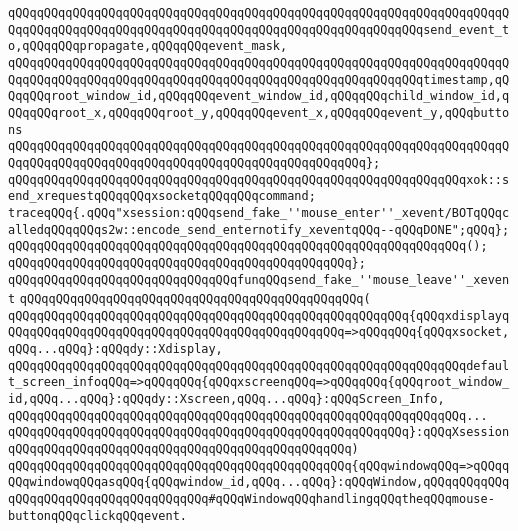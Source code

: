 \verb|qQQqqQQqqQQqqQQqqQQqqQQqqQQqqQQqqQQqqQQqqQQqqQQqqQQqqQQqqQQqqQQqqQQqqQQqqQQqqQQqqQQqqQQqqQQqqQQqqQQqqQQqqQQqqQQqqQQqqQQqqQQqqQQqsend_event_to,qQQqqQQqpropagate,qQQqqQQqevent_mask,|\newline
\verb|qQQqqQQqqQQqqQQqqQQqqQQqqQQqqQQqqQQqqQQqqQQqqQQqqQQqqQQqqQQqqQQqqQQqqQQqqQQqqQQqqQQqqQQqqQQqqQQqqQQqqQQqqQQqqQQqqQQqqQQqqQQqqQQqtimestamp,qQQqqQQqroot_window_id,qQQqqQQqevent_window_id,qQQqqQQqchild_window_id,qQQqqQQqroot_x,qQQqqQQqroot_y,qQQqqQQqevent_x,qQQqqQQqevent_y,qQQqbuttons|\newline
\verb|qQQqqQQqqQQqqQQqqQQqqQQqqQQqqQQqqQQqqQQqqQQqqQQqqQQqqQQqqQQqqQQqqQQqqQQqqQQqqQQqqQQqqQQqqQQqqQQqqQQqqQQqqQQqqQQqqQQqqQQq};|\newline
\newline
\verb|qQQqqQQqqQQqqQQqqQQqqQQqqQQqqQQqqQQqqQQqqQQqqQQqqQQqqQQqqQQqqQQqxok::send_xrequestqQQqqQQqxsocketqQQqqQQqcommand;|\newline
\verb|traceqQQq{.qQQq"xsession:qQQqsend_fake_''mouse_enter''_xevent/BOTqQQqcalledqQQqqQQqs2w::encode_send_enternotify_xeventqQQq--qQQqDONE";qQQq};|\newline
\verb|qQQqqQQqqQQqqQQqqQQqqQQqqQQqqQQqqQQqqQQqqQQqqQQqqQQqqQQqqQQqqQQq();|\newline
\verb|qQQqqQQqqQQqqQQqqQQqqQQqqQQqqQQqqQQqqQQqqQQqqQQq};|\newline
\newline
\newline
\verb|qQQqqQQqqQQqqQQqqQQqqQQqqQQqqQQqfunqQQqsend_fake_''mouse_leave''_xevent|\newline
\verb|qQQqqQQqqQQqqQQqqQQqqQQqqQQqqQQqqQQqqQQqqQQqqQQq(|\newline
\verb|qQQqqQQqqQQqqQQqqQQqqQQqqQQqqQQqqQQqqQQqqQQqqQQqqQQqqQQq{qQQqxdisplayqQQqqQQqqQQqqQQqqQQqqQQqqQQqqQQqqQQqqQQqqQQqqQQq=>qQQqqQQq{qQQqxsocket,qQQq...qQQq}:qQQqdy::Xdisplay,|\newline
\verb|qQQqqQQqqQQqqQQqqQQqqQQqqQQqqQQqqQQqqQQqqQQqqQQqqQQqqQQqqQQqqQQqdefault_screen_infoqQQq=>qQQqqQQq{qQQqxscreenqQQq=>qQQqqQQq{qQQqroot_window_id,qQQq...qQQq}:qQQqdy::Xscreen,qQQq...qQQq}:qQQqScreen_Info,|\newline
\verb|qQQqqQQqqQQqqQQqqQQqqQQqqQQqqQQqqQQqqQQqqQQqqQQqqQQqqQQqqQQqqQQq...|\newline
\verb|qQQqqQQqqQQqqQQqqQQqqQQqqQQqqQQqqQQqqQQqqQQqqQQqqQQqqQQq}:qQQqXsession|\newline
\verb|qQQqqQQqqQQqqQQqqQQqqQQqqQQqqQQqqQQqqQQqqQQqqQQq)|\newline
\verb|qQQqqQQqqQQqqQQqqQQqqQQqqQQqqQQqqQQqqQQqqQQqqQQq{qQQqwindowqQQq=>qQQqqQQqwindowqQQqasqQQq{qQQqwindow_id,qQQq...qQQq}:qQQqWindow,qQQqqQQqqQQqqQQqqQQqqQQqqQQqqQQqqQQqqQQq#qQQqWindowqQQqhandlingqQQqtheqQQqmouse-buttonqQQqclickqQQqevent.|\newline
